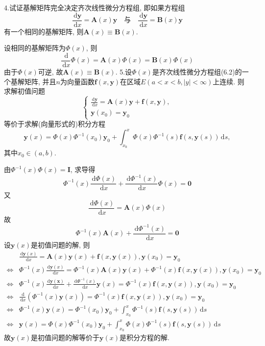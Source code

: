 \documentclass[titlepage,11pt,a4paper,twoside]{report}
\makeatletter
\newcommand\diff{\,\mathrm{d}}
\newcommand\bmitPhi{\bm{\varPhi}}
\renewenvironment{proof}{\par
	\pushQED{\qed}%
	\normalfont \topsep1\p@\@plus6\p@\relax
	\trivlist
	\item\relax
	{\hspace*{\parindent}{\heiti 证明}\@addpunct{:}}\hspace\labelsep\ignorespaces
}{%
	\popQED\endtrivlist\@endpefalse
}
\makeatother
\begin{document}
4.试证基解矩阵完全决定齐次线性微分方程组, 即如果方程组
\[\frac{\diff\bm{y}}{\diff x}=\bm{A}(x)\bm{y}\quad\mbox{与}\quad\frac{\diff\bm{y}}{\diff x}=\bm{B}(x)\bm{y}\]
有一个相同的基解矩阵, 则$\bm{A}(x)\equiv\bm{B}(x)$.
\begin{proof} 
设相同的基解矩阵为$\bmitPhi(x)$, 则
\[\frac{\diff}{\diff x}\bmitPhi(x)=\bm{A}(x)\bmitPhi(x)=\bm{B}(x)\bmitPhi(x)\]
由于$\bmitPhi(x)$可逆, 故$\bm{A}(x)\equiv\bm{B}(x)$.
\end{proof}
5.设$\bmitPhi(x)$是齐次线性微分方程组(6.2)的一个基解矩阵, 并且$n$为向量函数$\bm{f}(x,\bm{y})$在区域$E(a<x<b,|y|<\infty)$上连续. 则求解初值问题
\[\begin{cases}
\frac{\diff\bm{y}}{\diff x}=\bm{A}(x)\bm{y}+\bm{f}(x,\bm{y}),\\\bm{y}(x_0)=\bm{y}_0
\end{cases}\]
等价于求解(向量形式的)积分方程\[\bm{y}(x)=\bmitPhi(x)\bmitPhi^{-1}(x_0)\bm{y}_0+\int_{x_0}^x\bmitPhi(x)\bmitPhi^{-1}(s)\bm{f}(s,\bm{y}(s))\diff s,\]
其中$x_0\in(a,b)$.
\begin{proof} 由$\bmitPhi^{-1}(x)\bmitPhi(x)=\bm{I}$, 求导得
\[\bmitPhi^{-1}(x)\frac{\diff\bmitPhi(x)}{\diff x}+\frac{\diff\bmitPhi^{-1}(x)}{\diff x}\bmitPhi(x)=\bm{0}\]
又\[\frac{\diff\bmitPhi(x)}{\diff x}=\bm{A}(x)\bmitPhi(x)\]
故\[\bmitPhi^{-1}(x)\bm{A}(x)+\frac{\diff\bmitPhi^{-1}(x)}{\diff x}=\bm{0}\]
设$\bm{y}(x)$是初值问题的解, 则
\[\begin{split}
&\frac{\diff\bm{y}(x)}{\diff x}=\bm{A}(x)\bm{y}(x)+\bm{f}(x,\bm{y}(x)),\bm{y}(x_0)=\bm{y}_0\\
\Leftrightarrow&\bmitPhi^{-1}(x)\frac{\diff\bm{y}(x)}{\diff x}=\bmitPhi^{-1}(x)\bm{A}(x)\bm{y}(x)+\bmitPhi^{-1}(x)\bm{f}(x,\bm{y}(x)),\bm{y}(x_0)=\bm{y}_0\\
\Leftrightarrow&\bmitPhi^{-1}(x)\frac{\diff\bm{y(x)}}{\diff x}+\frac{\diff\bmitPhi^{-1}(x)}{\diff x}\bm{y}(x)=\bmitPhi^{-1}(x)\bm{f}(x,\bm{y}(x)),\bm{y}(x_0)=\bm{y}_0\\
\Leftrightarrow&\frac{\diff}{\diff x}\left(\bmitPhi^{-1}(x)\bm{y}(x)\right)=\bmitPhi^{-1}(x)\bm{f}(x,\bm{y}(x)),\bm{y}(x_0)=\bm{y}_0\\
\Leftrightarrow&\bmitPhi^{-1}(x)\bm{y}(x)=\bmitPhi^{-1}(x_0)\bm{y}_0+\int_{x_0}^x\bmitPhi^{-1}(s)\bm{f}(s,\bm{y}(s))\diff s\\
\Leftrightarrow&\bm{y}(x)=\bmitPhi(x)\bmitPhi^{-1}(x_0)\bm{y}_0+\int_{x_0}^x\bmitPhi(x)\bmitPhi^{-1}(s)\bm{f}(s,\bm{y}(s))\diff s
\end{split}\]
故$\bm{y}(x)$是初值问题的解等价于$\bm{y}(x)$是积分方程的解.
\end{proof}
\end{document}
